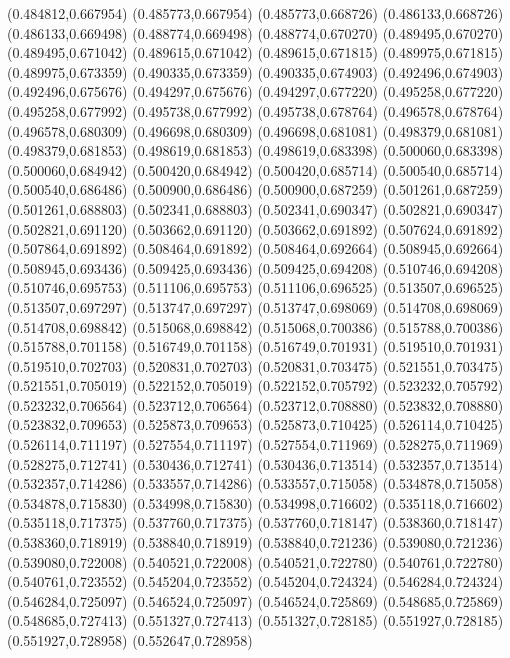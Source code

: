 (0.484812,0.667954)
(0.485773,0.667954)
(0.485773,0.668726)
(0.486133,0.668726)
(0.486133,0.669498)
(0.488774,0.669498)
(0.488774,0.670270)
(0.489495,0.670270)
(0.489495,0.671042)
(0.489615,0.671042)
(0.489615,0.671815)
(0.489975,0.671815)
(0.489975,0.673359)
(0.490335,0.673359)
(0.490335,0.674903)
(0.492496,0.674903)
(0.492496,0.675676)
(0.494297,0.675676)
(0.494297,0.677220)
(0.495258,0.677220)
(0.495258,0.677992)
(0.495738,0.677992)
(0.495738,0.678764)
(0.496578,0.678764)
(0.496578,0.680309)
(0.496698,0.680309)
(0.496698,0.681081)
(0.498379,0.681081)
(0.498379,0.681853)
(0.498619,0.681853)
(0.498619,0.683398)
(0.500060,0.683398)
(0.500060,0.684942)
(0.500420,0.684942)
(0.500420,0.685714)
(0.500540,0.685714)
(0.500540,0.686486)
(0.500900,0.686486)
(0.500900,0.687259)
(0.501261,0.687259)
(0.501261,0.688803)
(0.502341,0.688803)
(0.502341,0.690347)
(0.502821,0.690347)
(0.502821,0.691120)
(0.503662,0.691120)
(0.503662,0.691892)
(0.507624,0.691892)
(0.507864,0.691892)
(0.508464,0.691892)
(0.508464,0.692664)
(0.508945,0.692664)
(0.508945,0.693436)
(0.509425,0.693436)
(0.509425,0.694208)
(0.510746,0.694208)
(0.510746,0.695753)
(0.511106,0.695753)
(0.511106,0.696525)
(0.513507,0.696525)
(0.513507,0.697297)
(0.513747,0.697297)
(0.513747,0.698069)
(0.514708,0.698069)
(0.514708,0.698842)
(0.515068,0.698842)
(0.515068,0.700386)
(0.515788,0.700386)
(0.515788,0.701158)
(0.516749,0.701158)
(0.516749,0.701931)
(0.519510,0.701931)
(0.519510,0.702703)
(0.520831,0.702703)
(0.520831,0.703475)
(0.521551,0.703475)
(0.521551,0.705019)
(0.522152,0.705019)
(0.522152,0.705792)
(0.523232,0.705792)
(0.523232,0.706564)
(0.523712,0.706564)
(0.523712,0.708880)
(0.523832,0.708880)
(0.523832,0.709653)
(0.525873,0.709653)
(0.525873,0.710425)
(0.526114,0.710425)
(0.526114,0.711197)
(0.527554,0.711197)
(0.527554,0.711969)
(0.528275,0.711969)
(0.528275,0.712741)
(0.530436,0.712741)
(0.530436,0.713514)
(0.532357,0.713514)
(0.532357,0.714286)
(0.533557,0.714286)
(0.533557,0.715058)
(0.534878,0.715058)
(0.534878,0.715830)
(0.534998,0.715830)
(0.534998,0.716602)
(0.535118,0.716602)
(0.535118,0.717375)
(0.537760,0.717375)
(0.537760,0.718147)
(0.538360,0.718147)
(0.538360,0.718919)
(0.538840,0.718919)
(0.538840,0.721236)
(0.539080,0.721236)
(0.539080,0.722008)
(0.540521,0.722008)
(0.540521,0.722780)
(0.540761,0.722780)
(0.540761,0.723552)
(0.545204,0.723552)
(0.545204,0.724324)
(0.546284,0.724324)
(0.546284,0.725097)
(0.546524,0.725097)
(0.546524,0.725869)
(0.548685,0.725869)
(0.548685,0.727413)
(0.551327,0.727413)
(0.551327,0.728185)
(0.551927,0.728185)
(0.551927,0.728958)
(0.552647,0.728958)
